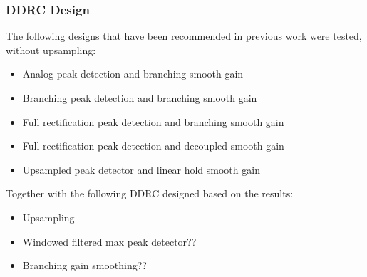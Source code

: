 \documentclass[../main2.tex]{subfiles}
\begin{document}
\subsubsection{DDRC Design}
The following designs that have been recommended in previous work were tested, without upsampling:
\begin{itemize}
\item{\cite{mcnally1984dynamic} Analog peak detection and branching smooth gain}
\item{\cite{dafx11} Branching peak detection and branching smooth gain}
\item{\cite{reiss2012tutorial} Full rectification peak detection and branching smooth gain}
\item{\cite{reiss2012tutorial} Full rectification peak detection and decoupled smooth gain}
\item{\cite{frindle1996implementation} Upsampled peak detector and linear hold smooth gain}
\end{itemize}
Together with the following DDRC designed based on the results:
\begin{itemize}
\item{Upsampling}
\item{Windowed filtered max peak detector??}
\item{Branching gain smoothing??}
\end{itemize}
\end{document}
